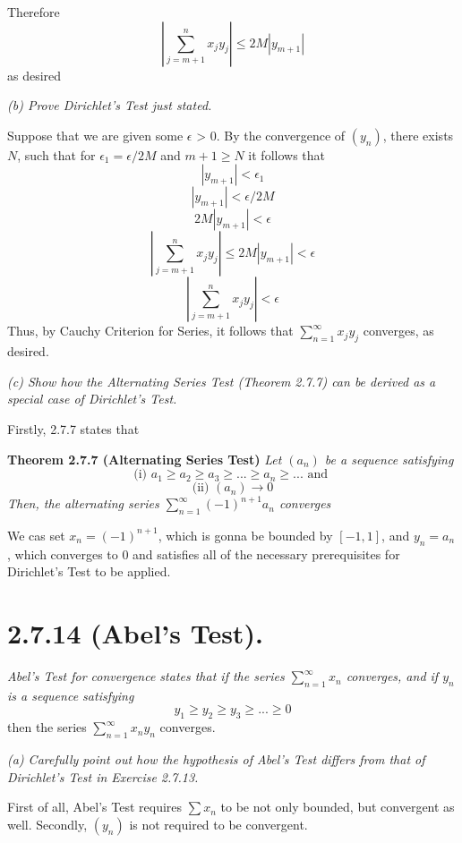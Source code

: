 \documentclass[11pt,oneside,titlepage]{book}
\begin{document}
Therefore
$$\left|\sum_{j = m + 1}^{n} x_j y_j\right| \leq 2M|y_{m + 1}|$$
as desired

\textit{(b) Prove Dirichlet's Test just stated.}

Suppose that we are given some $\epsilon$ > 0. By the convergence of $(y_n)$,
there exists $N$, such that for  $\epsilon_1 = \epsilon / 2M$ and $m + 1 \geq N$ it
follows that
$$|y_{m + 1}| < \epsilon_1$$
$$|y_{m + 1}| < \epsilon / 2M$$
$$2M|y_{m + 1}| < \epsilon$$
$$\left|\sum_{j = m + 1}^{n} x_j y_j\right| \leq 2M|y_{m + 1}| < \epsilon$$
$$\left|\sum_{j = m + 1}^{n} x_j y_j\right|  < \epsilon$$
Thus, by Cauchy Criterion for Series, it follows that
$\sum_{n = 1}^{\infty} x_j y_j$ converges, as desired.

\textit{(c) Show how the Alternating Series Test (Theorem 2.7.7) can be
  derived as a special case of Dirichlet's Test.}

Firstly, 2.7.7 states that

\textbf{Theorem 2.7.7 (Alternating Series Test)}
\textit{Let $(a_n)$ be a sequence satisfying}
$$\text{(i) } a_1 \geq a_2 \geq a_3 \geq ... \geq a_n \geq ... \text{ and }$$
$$\text{(ii) } (a_n) \to 0$$
\textit{Then, the alternating series $\sum_{n = 1}^{\infty}(-1)^{n + 1} a_n$
  converges}

We cas set $x_n = (-1)^{n + 1}$, which is gonna be bounded by $[-1, 1]$, and
$y_n = a_n$, which converges to 0 and satisfies all of the necessary
prerequisites for Dirichlet's Test to be applied.

\section*{2.7.14 (Abel's Test).}
\textit{Abel's Test for convergence states that if the series
  $\sum_{n = 1}^{\infty} x_n$ converges, and if $y_n$ is a sequence
  satisfying  }
$$y_1 \geq y_2 \geq y_3 \geq ... \geq 0$$
then the series $\sum_{n = 1}^{\infty} x_n y_n$ converges.

\textit{(a) Carefully point out how the hypothesis of Abel's Test differs from
  that of Dirichlet's Test in Exercise 2.7.13.}

First of all, Abel's Test requires $\sum x_n$ to be not only bounded, but
convergent as well. Secondly, $(y_n)$ is not required to be convergent.
\end{document}
